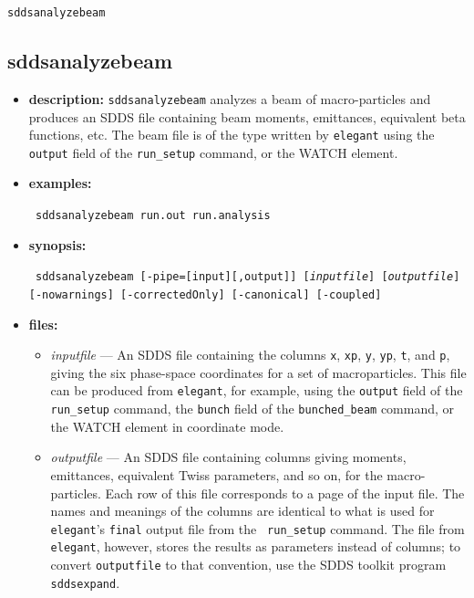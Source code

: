 \documentclass[11pt]{article}
\begin{document}
\newpage
\begin{center}{\Large\verb|sddsanalyzebeam|}\end{center}
\subsection{sddsanalyzebeam}
\label{sddsanalyzebeam}

\begin{itemize}
\item {\bf description:} 
{\tt sddsanalyzebeam} analyzes a beam of macro-particles and produces an SDDS file
containing beam moments, emittances, equivalent beta functions, etc.  The beam file
is of the type written by {\tt elegant} using the {\tt output} field of the {\tt run\_setup}
command, or the WATCH element.

\item {\bf examples:}
\begin{flushleft}{\tt
sddsanalyzebeam run.out run.analysis 
}\end{flushleft}

\item {\bf synopsis:}
\begin{flushleft}{\tt
sddsanalyzebeam [-pipe=[input][,output]] [{\em inputfile}] [{\em outputfile}]
[-nowarnings] [-correctedOnly] [-canonical] [-coupled]
}\end{flushleft}

\item {\bf files:}
\begin{itemize}
\item {\em inputfile} --- An SDDS file containing the columns {\tt x}, {\tt xp}, {\tt y},
{\tt yp}, {\tt t}, and {\tt p}, giving the six phase-space coordinates for a set of macroparticles.
This file can be produced from {\tt elegant}, for example, using the {\tt output} field of the {\tt run\_setup} 
command, the {\tt bunch} field of the {\tt bunched\_beam} command, or the WATCH element in
coordinate mode.

\item {\em outputfile} --- An SDDS file containing columns giving
moments, emittances, equivalent Twiss parameters, and so on, for the
macro-particles.  Each row of this file corresponds to a page of the
input file.  The names and meanings of the columns are identical to
what is used for {\tt elegant}'s {\tt final} output file from the {\tt
run\_setup} command.  The file from {\tt elegant}, however, stores the
results as parameters instead of columns; to convert {\tt outputfile}
to that convention, use the SDDS toolkit program {\tt sddsexpand}.


\end{itemize}
\end{itemize}
\end{document}
